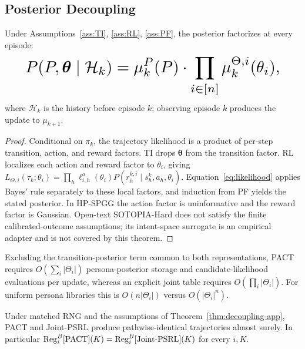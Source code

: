 \subsection{Posterior Decoupling}
\label{app:decoupling-proof}
\label{sec:decoupling}

\begin{theorem}
\label{thm:decoupling-app}
Under Assumptions~\ref{ass:TI}, \ref{ass:RL}, \ref{ass:PF}, the posterior factorizes at every episode:
\begin{equation}\label{eq:decoupling-app}\resizebox{0.9\linewidth}{!}{$\displaystyle P(P, \boldsymbol{\theta} \mid \mathcal{H}_k) = \mu_k^P(P) \cdot \prod_{i \in [n]} \mu_k^{\Theta,i}(\theta_i), $}\end{equation}
where $\mathcal H_k$ is the history before episode $k$; observing episode $k$ produces the update to $\mu_{k+1}$.
\end{theorem}

\begin{proof}[Proof]
Conditional on $\pi_k$, the trajectory likelihood is a product of per-step transition, action, and reward factors. TI drops $\boldsymbol\theta$ from the transition factor. RL localizes each action and reward factor to $\theta_i$, giving $L_{\Theta,i}(\tau_k;\theta_i) = \prod_h \ell^{a}_{i,h}(\theta_i) P(r_h^{k,i}\mid s_h^k,a_h,\theta_i)$. Equation~\eqref{eq:likelihood} applies Bayes' rule separately to these local factors, and induction from PF yields the stated posterior. In HP-SPGG the action factor is uninformative and the reward factor is Gaussian. Open-text SOTOPIA-Hard does not satisfy the finite calibrated-outcome assumptions; its intent-space surrogate is an empirical adapter and is not covered by this theorem.
\end{proof}

\begin{corollary}\label{cor:storage} Excluding the transition-posterior term common to both representations, PACT requires $O(\sum_i|\Theta_i|)$ persona-posterior storage and candidate-likelihood evaluations per update, whereas an explicit joint table requires $O(\prod_i|\Theta_i|)$. For uniform persona libraries this is $O(n|\Theta_i|)$ versus $O(|\Theta_i|^n)$. \end{corollary}

\begin{proposition}\label{prop:bit-identical} Under matched RNG and the assumptions of Theorem~\ref{thm:decoupling-app}, PACT and Joint-PSRL produce pathwise-identical trajectories almost surely. In particular $\mathrm{Reg}_i^B[\textnormal{PACT}](K) = \mathrm{Reg}_i^B[\textnormal{Joint-PSRL}](K)$ for every $i, K$. \end{proposition}


